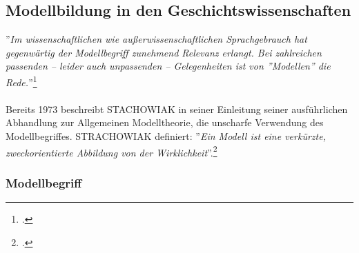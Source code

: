 \documentclass[12pt,a4paper]{article}
\begin{document}
\subsection{Modellbildung in den Geschichtswissenschaften}

''\textit{Im wissenschaftlichen wie außerwissenschaftlichen Sprachgebrauch hat gegenwärtig der Modellbegriff zunehmend Relevanz erlangt. Bei zahlreichen passenden -- leider auch unpassenden -- Gelegenheiten ist von ''Modellen'' die Rede.}''\footcite[][S.1]{stachowiak1973allgemeine}
\\
\\
Bereits 1973 beschreibt STACHOWIAK in seiner Einleitung seiner ausführlichen Abhandlung zur Allgemeinen Modelltheorie, die unscharfe Verwendung des Modellbegriffes. STRACHOWIAK definiert: ''\textit{Ein Modell ist eine verkürzte, zweckorientierte Abbildung von der Wirklichkeit}''.\footcite[][]{stachowiak1973allgemeine}

\subsubsection{Modellbegriff}
\end{document}
